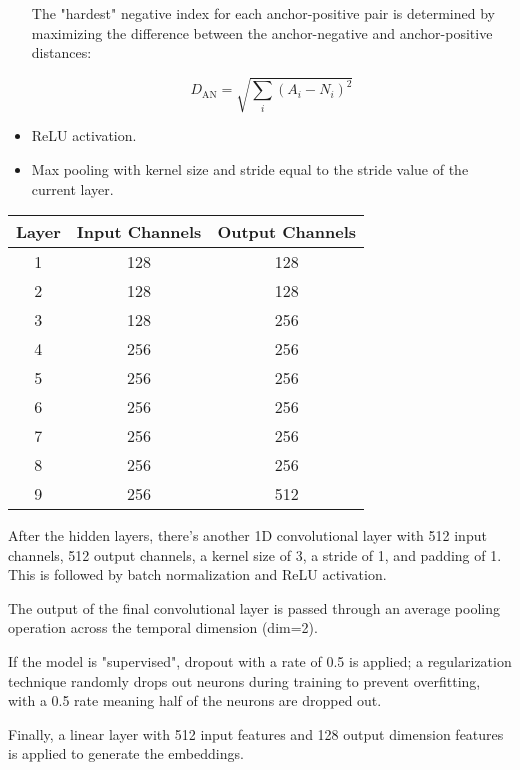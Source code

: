 \begin{itemize}
    The "hardest" negative index for each anchor-positive pair is determined by maximizing the difference between the anchor-negative and anchor-positive distances:

    \begin{equation}
D_{\text{AN}} = \sqrt{\sum_{i} (A_i - N_i)^2}
\end{equation}

    
    \item ReLU activation. 

    
    \item Max pooling with kernel size and stride equal to the stride value of the current layer.
\end{itemize}

\begin{tabular}{|c|c|c|}
\hline
\textbf{Layer} & \textbf{Input Channels} & \textbf{Output Channels} \\
\hline
1 & 128 & 128 \\
\hline
2 & 128 & 128 \\
\hline
3 & 128 & 256 \\
\hline
4 & 256 & 256 \\
\hline
5 & 256 & 256 \\
\hline
6 & 256 & 256 \\
\hline
7 & 256 & 256 \\
\hline
8 & 256 & 256 \\
\hline
9 & 256 & 512 \\
\hline
\end{tabular}

After the hidden layers, there's another 1D convolutional layer with 512 input channels, 512 output channels, a kernel size of 3, a stride of 1, and padding of 1. This is followed by batch normalization and ReLU activation.

The output of the final convolutional layer is passed through an average pooling operation across the temporal dimension (dim=2).

If the model is "supervised", dropout with a rate of 0.5 is applied; a regularization technique randomly drops out neurons during training to prevent overfitting, with a 0.5 rate meaning half of the neurons are dropped out.



Finally, a linear layer with 512 input features and 128 output dimension features is applied to generate the embeddings.



